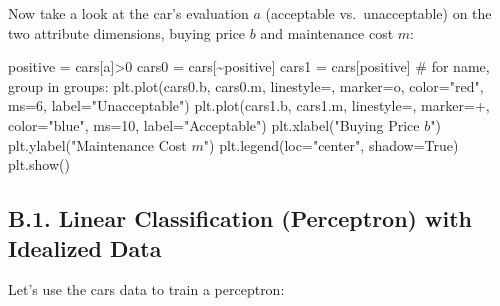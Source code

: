 \documentclass[
  letterpaper,
]{scrbook}
\newenvironment{Shaded}{\begin{snugshade}}{\end{snugshade}}
\newcommand{\CommentTok}[1]{\textcolor[rgb]{0.37,0.37,0.37}{#1}}
\newcommand{\DecValTok}[1]{\textcolor[rgb]{0.68,0.00,0.00}{#1}}
\newcommand{\NormalTok}[1]{\textcolor[rgb]{0.00,0.23,0.31}{#1}}
\newcommand{\OperatorTok}[1]{\textcolor[rgb]{0.37,0.37,0.37}{#1}}
\newcommand{\StringTok}[1]{\textcolor[rgb]{0.13,0.47,0.30}{#1}}
\newcommand{\VariableTok}[1]{\textcolor[rgb]{0.07,0.07,0.07}{#1}}
\begin{document}
Now take a look at the car's evaluation \(a\) (acceptable
vs.~unacceptable) on the two attribute dimensions, buying price \(b\)
and maintenance cost \(m\):

\begin{Shaded}
\begin{Highlighting}[]
\NormalTok{positive }\OperatorTok{=}\NormalTok{ cars[}\StringTok{\textquotesingle{}a\textquotesingle{}}\NormalTok{]}\OperatorTok{\textgreater{}}\DecValTok{0}
\NormalTok{cars0 }\OperatorTok{=}\NormalTok{ cars[}\OperatorTok{\textasciitilde{}}\NormalTok{positive]}
\NormalTok{cars1 }\OperatorTok{=}\NormalTok{ cars[positive]}
\CommentTok{\# for name, group in groups: }
\NormalTok{plt.plot(cars0.b, cars0.m, linestyle}\OperatorTok{=}\StringTok{\textquotesingle{}\textquotesingle{}}\NormalTok{, marker}\OperatorTok{=}\StringTok{\textquotesingle{}o\textquotesingle{}}\NormalTok{, }
\NormalTok{         color}\OperatorTok{=}\StringTok{"red"}\NormalTok{, ms}\OperatorTok{=}\DecValTok{6}\NormalTok{, label}\OperatorTok{=}\StringTok{"Unacceptable"}\NormalTok{)}
\NormalTok{plt.plot(cars1.b, cars1.m, linestyle}\OperatorTok{=}\StringTok{\textquotesingle{}\textquotesingle{}}\NormalTok{, marker}\OperatorTok{=}\StringTok{\textquotesingle{}+\textquotesingle{}}\NormalTok{, }
\NormalTok{         color}\OperatorTok{=}\StringTok{"blue"}\NormalTok{, ms}\OperatorTok{=}\DecValTok{10}\NormalTok{, label}\OperatorTok{=}\StringTok{"Acceptable"}\NormalTok{)}
\NormalTok{plt.xlabel(}\StringTok{"Buying Price $b$"}\NormalTok{)}
\NormalTok{plt.ylabel(}\StringTok{"Maintenance Cost $m$"}\NormalTok{)}
\NormalTok{plt.legend(loc}\OperatorTok{=}\StringTok{"center"}\NormalTok{, shadow}\OperatorTok{=}\VariableTok{True}\NormalTok{)}
\NormalTok{plt.show()}
\end{Highlighting}
\end{Shaded}

\subsection*{B.1. Linear Classification (Perceptron) with Idealized
Data}\label{b.1.-linear-classification-perceptron-with-idealized-data}

Let's use the cars data to train a perceptron:
\end{document}
